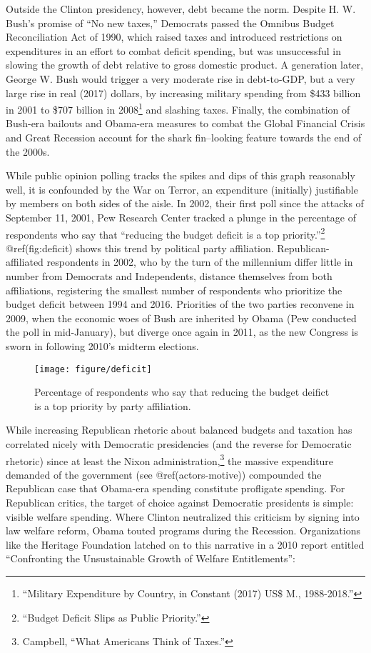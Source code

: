 \documentclass[
]{article}
\let\rmarkdownfootnote\footnote%
\def\footnote{\protect\rmarkdownfootnote}
\begin{document}
Outside the Clinton presidency, however, debt became the norm. Despite
H. W. Bush's promise of ``No new taxes,'' Democrats passed the Omnibus
Budget Reconciliation Act of 1990, which raised taxes and introduced
restrictions on expenditures in an effort to combat deficit spending,
but was unsuccessful in slowing the growth of debt relative to gross
domestic product. A generation later, George W. Bush would trigger a
very moderate rise in debt-to-GDP, but a very large rise in real (2017)
dollars, by increasing military spending from \$433 billion in 2001 to
\$707 billion in 2008\footnote{``Military Expenditure by Country, in
  Constant (2017) US\$ M., 1988-2018.''} and slashing taxes. Finally,
the combination of Bush-era bailouts and Obama-era measures to combat
the Global Financial Crisis and Great Recession account for the shark
fin--looking feature towards the end of the 2000s.

While public opinion polling tracks the spikes and dips of this graph
reasonably well, it is confounded by the War on Terror, an expenditure
(initially) justifiable by members on both sides of the aisle. In 2002,
their first poll since the attacks of September 11, 2001, Pew Research
Center tracked a plunge in the percentage of respondents who say that
``reducing the budget deficit is a top priority.''\footnote{``Budget
  Deficit Slips as Public Priority.''} @ref(fig:deficit) shows this
trend by political party affiliation. Republican-affiliated respondents
in 2002, who by the turn of the millennium differ little in number from
Democrats and Independents, distance themselves from both affiliations,
registering the smallest number of respondents who prioritize the budget
deficit between 1994 and 2016. Priorities of the two parties reconvene
in 2009, when the economic woes of Bush are inherited by Obama (Pew
conducted the poll in mid-January), but diverge once again in 2011, as
the new Congress is sworn in following 2010's midterm elections.

\begin{figure}

{\centering \texttt{[image: figure/deficit]}

}

\caption{Percentage of respondents who say that reducing the budget deifict is a top priority by party affiliation.}\label{fig:deficit}
\end{figure}

While increasing Republican rhetoric about balanced budgets and taxation
has correlated nicely with Democratic presidencies (and the reverse for
Democratic rhetoric) since at least the Nixon administration,\footnote{Campbell,
  ``What Americans Think of Taxes.''} the massive expenditure demanded
of the government (see @ref(actors-motive)) compounded the Republican
case that Obama-era spending constitute profligate spending. For
Republican critics, the target of choice against Democratic presidents
is simple: visible welfare spending. Where Clinton neutralized this
criticism by signing into law welfare reform, Obama touted programs
during the Recession. Organizations like the Heritage Foundation latched
on to this narrative in a 2010 report entitled ``Confronting the
Unsustainable Growth of Welfare Entitlements'':
\end{document}
